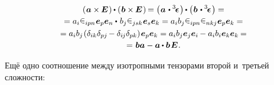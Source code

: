 \begin{otherlanguage}{russian}
\vspace{-1em}\begin{multline}\label{vectorcrossidentitydotvectorcrossidentity}
\left( \hspace{.1ex} \bm{a} \times\hspace{-0.1ex} \bm{E} \hspace{.16ex} \right) \hspace{-0.1ex} \dotp \left( \hspace{.12ex} \bm{b} \times\hspace{-0.1ex} \bm{E} \hspace{.16ex} \right) \hspace{-0.2ex}
= \left( \hspace{.1ex} \bm{a} \hspace{.2ex} \dotp \levicivitatensor \hspace{.16ex}\right) \hspace{-0.12ex}\dotp \left(\hspace{.1ex} \bm{b} \hspace{.2ex} \dotp \levicivitatensor \hspace{.16ex}\right) =
\\[-0.1em]
%
= a_i \levicivita_{ipn} \hspace{.1ex} \bm{e}_p \bm{e}_n \dotp \hspace{.2ex} b_j \levicivita_{jsk} \hspace{.1ex} \bm{e}_s \bm{e}_k
= a_i b_j \levicivita_{ipn} \levicivita_{nkj} \hspace{.05ex} \bm{e}_p \bm{e}_k =
\\
%
= a_i b_j \hspace{-0.2ex} \left( \delta_{ik} \delta_{pj} \hspace{-0.2ex} - \delta_{i\hspace{-0.1ex}j} \delta_{pk} \right) \hspace{-0.2ex} \bm{e}_p \bm{e}_k
= a_i b_j \bm{e}_j \bm{e}_i \hspace{-0.12ex} - a_i b_i \bm{e}_k \bm{e}_k \hspace{-0.16ex} =
\\[-0.08em]
%
= \hspace{.1ex} \bm{b} \bm{a} - \bm{a} \hspace{-0.1ex} \dotp \bm{b} \hspace{.2ex} \bm{E} \hspace{.1ex}.
\end{multline}

\vspace{-0.2em} Ещё одно соотношение между изотропными тензорами второй и~третьей сложности:


\end{otherlanguage}

